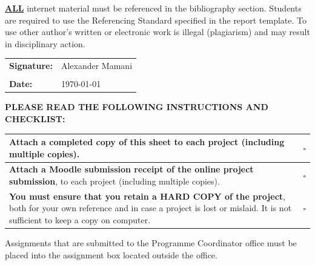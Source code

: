 \underline {\textbf{ALL}} internet material must be referenced in the bibliography section. Students are required to use the Referencing Standard specified in the report template. To use other author's written or electronic work is illegal (plagiarism) and may result in disciplinary action.

\begin{table}[!h]
\begin{center}
\small
\begin{tabular}{||p{}|p{}||}
	\hline
	\textbf{Signature:} &       Alexander Mamani \\
	                    &        \\ \hline
	\textbf{Date:}      & \today \\ \hline
\end{tabular}
\end{center}
\end{table}

\vspace{-.5cm}
\noindent \textbf{PLEASE READ THE FOLLOWING INSTRUCTIONS AND CHECKLIST:}\\
\vspace{-.5cm}

\begin{table}[!h]
\begin{center}
\small
\begin{tabular}{||p{}|p{}||}
	\hline
	Attach a completed copy of this sheet to each project (including multiple copies).                                                                                                           & $\square$ \\ \hline
	\textbf{Attach a Moodle submission receipt of the online project submission}, to each project (including multiple copies).                                                                   & $\square$ \\ \hline
	\textbf{You must ensure that you retain a HARD COPY of the project}, both for your own reference and in case a project is lost or mislaid. It is not sufficient to keep a copy on computer. & $\square$ \\ \hline
\end{tabular}
\end{center}
\end{table}
\vspace{-.5cm}

Assignments that are submitted to the Programme Coordinator office must be placed into the assignment box located outside the office.

